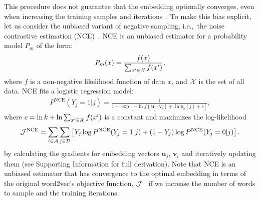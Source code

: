 \documentclass[12pt]{article} %
\newcommand{\vect}[1]{\boldsymbol{#1}}
\def\ie{i.e.,~}
\begin{document}
This procedure does not guarantee that the embedding optimally converges, even when increasing the training samples and iterations~\autocite{Chia2010,Dyer2014}. To make this bias explicit, let us consider the unbiased variant of negative sampling, \ie the noise contrastive estimation (NCE)~\autocite{Chia2010,Dyer2014}.
NCE is an unbiased estimator for a probability model $P_m$ of the form:
\begin{align}
	\label{eq:nce-model}
	P_m(x) = \frac{ f(x) }{\sum_{ x' \in {\cal X}} f(x') },
\end{align}
where $f$ is a non-negative likelihood function of data $x$, and ${\cal X}$ is the set of all data. NCE fits a logistic regression model:
\begin{align}
	\label{eq:nce}
	P^{\text{NCE}}\left(Y_{j}=1 \vert j\right) = \frac{
		1
	}{
		1 + \exp\left[ - \ln f(\vect{u}_j \cdot \vect{v}_{i})  + \ln p_0(j) + c \right]
	},
\end{align}
where $c = \ln k + \ln\sum_{ x' \in {\cal X}} f(x') $ is a constant and maximizes the log-likelihood
\begin{align}
	\label{eq:log-likelihood-logistic-regress}
	{\cal J}^{\text{NCE}} = \sum_{i \in {\cal A}}\sum_{j \in {\cal D}} \left[ Y_{j} \log P^{\text{NCE}}(Y_{j} = 1\vert j) + (1-Y_{j}) \log P^{\text{NCE}}(Y_{j} = 0 \vert j)\right].
\end{align}
by calculating the gradients for embedding vectors $\vect{u}_j$, $\vect{v}_{i}$ and iteratively updating them (see Supporting Information for full derivation). Note that NCE is an unbiased estimator that has convergence to the optimal embedding in terms of the original word2vec's objective function, ${\cal J}$~\autocite{Chia2010,Dyer2014} if we increase the number of words to sample and the training iterations.
\end{document}
